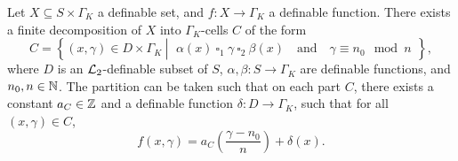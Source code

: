 \begin{prop}\label{prop:partialcd2}
Let $X \subseteq S \times \Gamma_K$ a definable set, and $f: X \to \Gamma_K$ a definable function.%
There exists a finite decomposition of $X$ into $\Gamma_K$-cells $C$ of the form
\[C = \left\{(x,\gamma) \in D \times \Gamma_K \ \left| \ \begin{array}{l}\alpha(x)\ \square_1 \ \gamma \ \square_2 \  \beta(x)\quad \text{and}\quad \gamma \equiv n_0 \mod n \end{array} \right\}\right.,\]
where $D$ is an $\mathcal{L}_2$-definable subset of $S$, $\alpha, \beta: S \to \Gamma_K$ are definable functions, and $n_0,n \in {\mathbb N}$. The partition can be taken such that on each part $C$, there exists a constant $a_{C} \in {\mathbb Z}$ and a definable function $\delta: D \to \Gamma_K$, such that for all $(x,\gamma) \in C$,
\[f(x,\gamma) = a_C \left(\frac{\gamma -n_0}{n}\right) + \delta(x).\]
 \end{prop}

